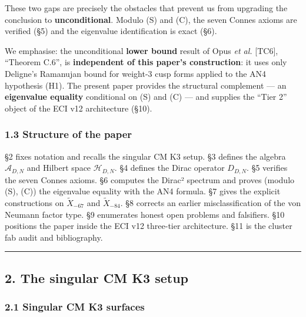 \documentclass[
  11pt,
  a4paper,
]{amsart}
\begin{document}
These two gaps are precisely the obstacles that prevent us from upgrading the
conclusion to \textbf{unconditional}. Modulo (S) and (C), the seven Connes axioms
are verified (§5) and the eigenvalue identification is exact (§6).

We emphasise: the unconditional \textbf{lower bound} result of Opus \emph{et al.} {[}TC6{]},
``Theorem C.6'', is \textbf{independent of this paper's construction}: it uses only
Deligne's Ramanujan bound for weight-3 cusp forms applied to the AN4
hypothesis (H1). The present paper provides the structural complement ---
an \textbf{eigenvalue equality} conditional on (S) and (C) --- and supplies the
``Tier 2'' object of the ECI v12 architecture (§10).

\hypertarget{structure-of-the-paper}{%
\subsubsection{1.3 Structure of the paper}\label{structure-of-the-paper}}

§2 fixes notation and recalls the singular CM K3 setup. §3 defines the algebra
\(\mathcal{A}_{D,N}\) and Hilbert space \(\mathcal{H}_{D,N}\). §4 defines the Dirac
operator \(D_{D,N}\). §5 verifies the seven Connes axioms. §6 computes the
Dirac² spectrum and proves (modulo (S), (C)) the eigenvalue equality with the
AN4 formula. §7 gives the explicit constructions on \(\widetilde{X}_{-67}\) and
\(\widetilde{X}_{-84}\). §8 corrects an earlier misclassification of the von
Neumann factor type. §9 enumerates honest open problems and falsifiers.
§10 positions the paper inside the ECI v12 three-tier architecture. §11 is the
cluster fab audit and bibliography.

\begin{center}\rule{0.5\linewidth}{0.5pt}\end{center}

\hypertarget{the-singular-cm-k3-setup}{%
\subsection{2. The singular CM K3 setup}\label{the-singular-cm-k3-setup}}

\hypertarget{singular-cm-k3-surfaces}{%
\subsubsection{2.1 Singular CM K3 surfaces}\label{singular-cm-k3-surfaces}}
\end{document}
